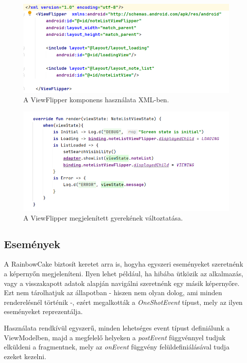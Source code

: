 \begin{figure}[!ht]
	\centering
	\includegraphics[width=150mm, keepaspectratio]{figures/view_flipper_impl.png}
	\caption{A ViewFlipper komponens használata XML-ben.}
	\label{fig:ViewFlipperComponent}
\end{figure}

\begin{figure}[!ht]
	\centering
	\includegraphics[width=150mm, keepaspectratio]{figures/view_flipper_usage.png}
	\caption{A ViewFlipper megjelenített gyerekének változtatása.}
	\label{fig:ViewFlipperUsage}
\end{figure}

\subsection{Események}
A RainbowCake biztosít keretet arra is, hogyha egyszeri eseményeket szeretnénk a képernyőn megjeleníteni. Ilyen lehet például, ha hibába ütközik az alkalmazás, vagy a visszakapott adatok alapján navigálni szeretnénk egy másik képernyőre. Ezt nem tárolhatjuk az állapotban - hiszen nem olyan dolog, ami minden renderelésnél történik -, ezért megalkották a \emph{OneShotEvent} típust, mely az ilyen eseményeket reprezentálja. \cite{Events}

Használata rendkívül egyszerű, minden lehetséges event típust definiálunk a ViewModelben, majd a megfelelő helyeken a \emph{postEvent} függvénnyel tudjuk elküldeni a fragmentnek, mely az \emph{onEvent} függvény felüldefiniálásával tudja ezeket kezelni. 

